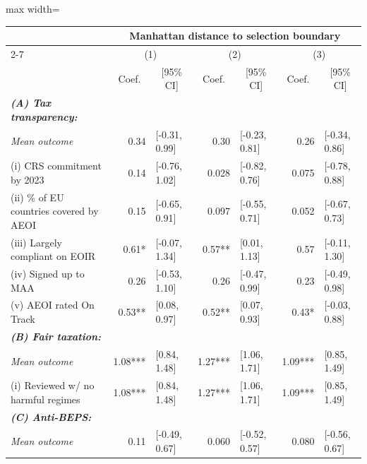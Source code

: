 \begin{adjustbox}{max width=\textwidth}
\begin{tabular}{l*{3}{r@{\hspace{3pt}}l}}
\toprule
&\multicolumn{6}{c}{{\bf Manhattan distance to selection boundary}}\\
\cmidrule(lr){2-7}
&\multicolumn{2}{c}{(1)}&\multicolumn{2}{c}{(2)}&\multicolumn{2}{c}{(3)}\\
&\multicolumn{1}{c}{Coef.}&\multicolumn{1}{c}{[95\% CI]}&\multicolumn{1}{c}{Coef.}&\multicolumn{1}{c}{[95\% CI]}&\multicolumn{1}{c}{Coef.}&\multicolumn{1}{c}{[95\% CI]}\\
\midrule
\emph{{\bf (A) Tax transparency: }}&&&&&&\\
\hspace{.3cm} \emph{Mean outcome}& 0.34 & [-0.31, 0.99] & 0.30 & [-0.23, 0.81] & 0.26 & [-0.34, 0.86] \\
\hspace{.4cm} (i) CRS commitment by 2023& 0.14 & [-0.76, 1.02] & 0.028 & [-0.82, 0.76] & 0.075 & [-0.78, 0.88] \\
\hspace{.4cm} (ii) \% of EU countries covered by AEOI& 0.15 & [-0.65, 0.91] & 0.097 & [-0.55, 0.71] & 0.052 & [-0.67, 0.73] \\
\hspace{.4cm} (iii) Largely compliant on EOIR& 0.61* & [-0.07, 1.34] & 0.57** & [0.01, 1.13] & 0.57 & [-0.11, 1.30] \\
\hspace{.4cm} (iv) Signed up to MAA& 0.26 & [-0.53, 1.10] & 0.26 & [-0.47, 0.99] & 0.23 & [-0.49, 0.98] \\
\hspace{.4cm} (v) AEOI rated On Track& 0.53** & [0.08, 0.97] & 0.52** & [0.07, 0.93] & 0.43* & [-0.03, 0.88] \\
\midrule \emph{{\bf (B) Fair taxation: }}&&&&&&\\
\hspace{.3cm} \emph{Mean outcome}& 1.08*** & [0.84, 1.48] & 1.27*** & [1.06, 1.71] & 1.09*** & [0.85, 1.49] \\
\hspace{.3cm} (i) Reviewed w/ no harmful regimes& 1.08*** & [0.84, 1.48] & 1.27*** & [1.06, 1.71] & 1.09*** & [0.85, 1.49] \\
\midrule \emph{{\bf (C) Anti-BEPS: }}&&&&&&\\
\hspace{.3cm} \emph{Mean outcome}& 0.11 & [-0.49, 0.67] & 0.060 & [-0.52, 0.57] & 0.080 & [-0.56, 0.67] \\

\end{tabular}
\end{adjustbox}
